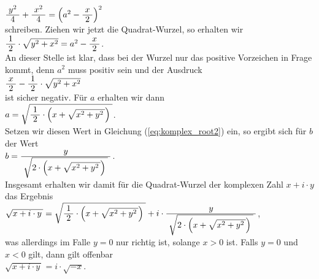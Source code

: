 $\bruch{y^2}{4} + \bruch{x^2}{4} = \left(a^2 - \bruch{x}{2}\right)^2$
\\[0.2cm]
schreiben.  Ziehen wir jetzt die Quadrat-Wurzel, so erhalten wir
\\[0.2cm]
\hspace*{1.3cm}
$\bruch{1}{2} \cdot \sqrt{y^2 + x^2} = a^2 - \bruch{x}{2}$.
\\[0.2cm]
An dieser Stelle ist klar, dass bei der Wurzel nur das positive Vorzeichen in Frage kommt, denn
$a^2$ muss positiv sein und der Ausdruck
\\[0.2cm]
\hspace*{1.3cm}
$\bruch{x}{2} - \bruch{1}{2} \cdot \sqrt{y^2 + x^2}$
\\[0.2cm]
ist sicher negativ.  Für $a$ erhalten wir dann
\\[0.2cm]
\hspace*{1.3cm}
$a = \sqrt{\bruch{1}{2} \cdot \Bigl(x + \sqrt{x^2 + y^2\,}\Bigr)\;}$.
\\[0.2cm]
Setzen wir diesen Wert in Gleichung (\ref{eq:komplex_root2}) ein, so ergibt sich für $b$ der Wert
\\[0.2cm]
\hspace*{1.3cm}
$b = \bruch{y}{\sqrt{2\cdot \Bigl(x + \sqrt{x^2 + y^2\,}\Bigr)\;}}$.
\\[0.2cm]
Insgesamt erhalten wir damit für die Quadrat-Wurzel der komplexen Zahl $x + i \cdot y$ das Ergebnis
\\[0.2cm]
\hspace*{1.3cm}
$\sqrt{x + i \cdot y\,} = \sqrt{\bruch{1}{2} \cdot \Bigl(x + \sqrt{x^2 + y^2\,}\Bigr)\;}
 + i \cdot \bruch{y}{\sqrt{2\cdot \Bigl(x + \sqrt{x^2 + y^2\,}\Bigr)\;}}
$,
\\[0.2cm]
was allerdings im Falle $y = 0$ nur richtig ist, solange $x > 0$ ist.  Falls $y = 0$ und $x < 0$ gilt,
dann gilt offenbar
\\[0.2cm]
\hspace*{1.3cm}
$\sqrt{x + i \cdot y\,} = i \cdot \sqrt{-x}$.


